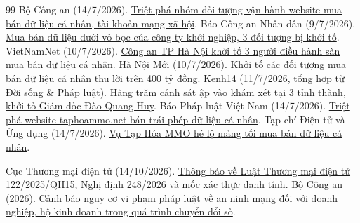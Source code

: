 \begin{thebibliography}{99}
 Bộ Công an (14/7/2026). \href{https://www.bocongan.gov.vn/bai-viet/triet-pha-nhom-doi-tuong-van-hanh-website-mua-ban-du-lieu-ca-nhan-tai-khoan-mang-xa-hoi-rac-1784022194}{Triệt phá nhóm đối tượng vận hành website mua bán dữ liệu cá nhân, tài khoản mạng xã hội}.
 Báo Công an Nhân dân (9/7/2026). \href{https://cand.vn/mua-ban-du-lieu-duoi-vo-boc-cua-cong-ty-khoi-nghiep-3-doi-tuong-bi-khoi-to-post816257.html}{Mua bán dữ liệu dưới vỏ bọc của công ty khởi nghiệp, 3 đối tượng bị khởi tố}.
 VietNamNet (10/7/2026). \href{https://vietnamnet.vn/cong-an-tp-ha-noi-khoi-to-3-nguoi-dieu-hanh-san-mua-ban-du-lieu-ca-nhan-2534474.html}{Công an TP Hà Nội khởi tố 3 người điều hành sàn mua bán dữ liệu cá nhân}.
 Hà Nội Mới (10/7/2026). \href{https://hanoimoi.vn/khoi-to-cac-doi-tuong-mua-ban-du-lieu-ca-nhan-thu-loi-tren-400-ty-dong-1211456.html}{Khởi tố các đối tượng mua bán dữ liệu cá nhân thu lời trên 400 tỷ đồng}.
 Kenh14 (11/7/2026, tổng hợp từ Đời sống \& Pháp luật). \href{https://kenh14.vn/hang-tram-canh-sat-ap-vao-kham-xet-tai-3-tinh-thanh-khoi-to-giam-doc-dao-quang-huy-sn-1992-215260710160532629.chn}{Hàng trăm cảnh sát ập vào khám xét tại 3 tỉnh thành, khởi tố Giám đốc Đào Quang Huy}.
 Báo Pháp luật Việt Nam (14/7/2026). \href{https://baophapluat.vn/triet-pha-website-taphoammo-net-ban-trai-phep-du-lieu-ca-nhan-thu-loi-tu-he-thong-1-35-trieu-tai-khoan.html}{Triệt phá website taphoammo.net bán trái phép dữ liệu cá nhân}.
 Tạp chí Điện tử và Ứng dụng (14/7/2026). \href{https://dientuungdung.vn/vu-tap-hoa-mmo-he-lo-mang-toi-mua-ban-du-lieu-ca-nhan-16575.html}{Vụ Tạp Hóa MMO hé lộ mảng tối mua bán dữ liệu cá nhân}.

 Cục Thương mại điện tử (14/10/2026). \href{https://www.idea.gov.vn/default.aspx?category_id=6e3f3b28-3917-4816-83c5-a331259dd181&do=detail&id=184e0d3f-daab-42a5-a33e-782c78e579c0&page=news}{Thông báo về Luật Thương mại điện tử 122/2025/QH15, Nghị định 248/2026 và mốc xác thực danh tính}.
 Bộ Công an (2026). \href{https://bocongan.gov.vn/chinh-sach-phap-luat/bai-viet/canh-bao-nguy-co-vi-pham-phap-luat-ve-an-ninh-mang-doi-voi-doanh-nghiep-ho-kinh-doanh-trong-qua-trinh-chuyen-doi-so-1785806444}{Cảnh báo nguy cơ vi phạm pháp luật về an ninh mạng đối với doanh nghiệp, hộ kinh doanh trong quá trình chuyển đổi số}.


\end{thebibliography}
